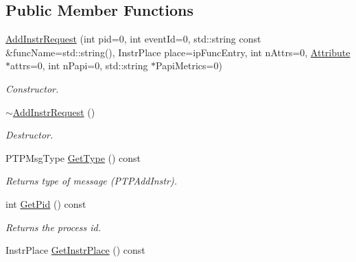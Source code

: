 \subsection*{Public Member Functions}
\begin{DoxyCompactItemize}
\item 
\hyperlink{class_common_1_1_add_instr_request_a68a7aaf187b3d45a125f7de8ca76b780}{Add\-Instr\-Request} (int pid=0, int event\-Id=0, std\-::string const \&func\-Name=std\-::string(), Instr\-Place place=ip\-Func\-Entry, int n\-Attrs=0, \hyperlink{class_common_1_1_attribute}{Attribute} $\ast$attrs=0, int n\-Papi=0, std\-::string $\ast$Papi\-Metrics=0)
\begin{DoxyCompactList}\small\item\em Constructor. \end{DoxyCompactList}\item 
\hypertarget{class_common_1_1_add_instr_request_a9c4bdab0d2f8cb229a6057a25674672d}{\hyperlink{class_common_1_1_add_instr_request_a9c4bdab0d2f8cb229a6057a25674672d}{$\sim$\-Add\-Instr\-Request} ()}\label{class_common_1_1_add_instr_request_a9c4bdab0d2f8cb229a6057a25674672d}

\begin{DoxyCompactList}\small\item\em Destructor. \end{DoxyCompactList}\item 
\hypertarget{class_common_1_1_add_instr_request_a9c1b7191b6289cc9b724d06428601b4b}{P\-T\-P\-Msg\-Type \hyperlink{class_common_1_1_add_instr_request_a9c1b7191b6289cc9b724d06428601b4b}{Get\-Type} () const }\label{class_common_1_1_add_instr_request_a9c1b7191b6289cc9b724d06428601b4b}

\begin{DoxyCompactList}\small\item\em Returns type of message (P\-T\-P\-Add\-Instr). \end{DoxyCompactList}\item 
\hypertarget{class_common_1_1_add_instr_request_aeff18bc4bbbdd7e5df05d6ed697446e0}{int \hyperlink{class_common_1_1_add_instr_request_aeff18bc4bbbdd7e5df05d6ed697446e0}{Get\-Pid} () const }\label{class_common_1_1_add_instr_request_aeff18bc4bbbdd7e5df05d6ed697446e0}

\begin{DoxyCompactList}\small\item\em Returns the process id. \end{DoxyCompactList}\item 
\hypertarget{class_common_1_1_add_instr_request_ac4799ac58ff77a45b4980478a04dd0b4}{Instr\-Place \hyperlink{class_common_1_1_add_instr_request_ac4799ac58ff77a45b4980478a04dd0b4}{Get\-Instr\-Place} () const }\label{class_common_1_1_add_instr_request_ac4799ac58ff77a45b4980478a04dd0b4}


\end{DoxyCompactItemize}
